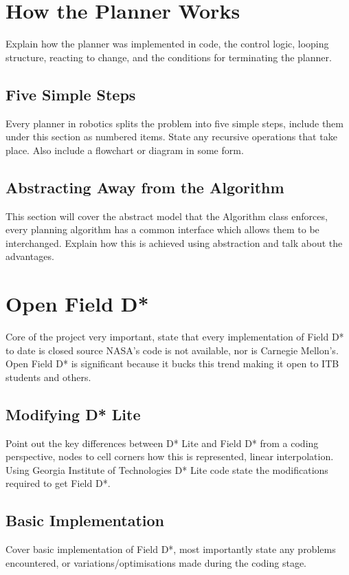 
\section{How the Planner Works}
Explain how the planner was implemented in code, the control logic, looping structure, reacting to change, and the conditions for terminating the planner.

\subsection{Five Simple Steps}
Every planner in robotics splits the problem into five simple steps, include them under this section as numbered items. State any recursive operations that take place. Also include a flowchart or diagram in some form.

\subsection{Abstracting Away from the Algorithm}
This section will cover the abstract model that the Algorithm class enforces, every planning algorithm has a common interface which allows them to be interchanged. Explain how this is achieved using abstraction and talk about the advantages.


\section{Open Field D*}
Core of the project very important, state that every implementation of Field D* to date is closed source NASA's code is not available, nor is Carnegie Mellon's. Open Field D* is significant because it bucks this trend making it open to ITB students and others.

\subsection{Modifying D* Lite}
Point out the key differences between D* Lite and Field D* from a coding perspective, nodes to cell corners how this is represented, linear interpolation. Using Georgia Institute of Technologies D* Lite code state the modifications required to get Field D*.

\subsection{Basic Implementation}
Cover basic implementation of Field D*, most importantly state any problems encountered, or variations/optimisations made during the coding stage.

